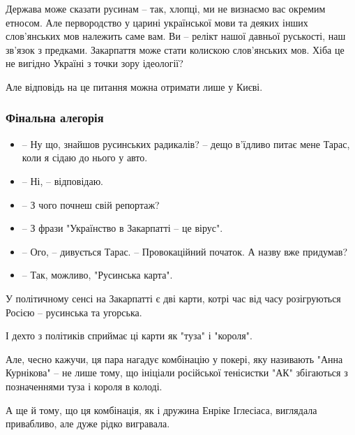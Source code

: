 Держава може сказати русинам – так, хлопці, ми не визнаємо вас окремим етносом.
Але первородство у царині української мови та деяких інших слов’янських мов
належить саме вам. Ви – релікт нашої давньої руськості, наш зв'язок з предками.
Закарпаття може стати колискою слов’янських мов. Хіба це не вигідно Україні з
точки зору ідеології?

Але відповідь на це питання можна отримати лише у Києві.

\subsubsection{Фінальна алегорія}

\begin{itemize}
  \item – Ну що, знайшов русинських радикалів? – дещо в’їдливо питає мене Тарас, коли я сідаю до нього у авто.
  \item – Ні, – відповідаю.
  \item – З чого почнеш свій репортаж?
  \item – З фрази "Українство в Закарпатті – це вірус".
  \item – Ого, – дивується Тарас. – Провокаційний початок. А назву вже придумав?
  \item – Так, можливо, "Русинська карта".
\end{itemize}

У політичному сенсі на Закарпатті є дві карти, котрі час від часу розігруються
Росією – русинська та угорська.

І дехто з політиків сприймає ці карти як "туза" і "короля".

Але, чесно кажучи, ця пара нагадує комбінацію у покері, яку називають "Анна
Курнікова" – не лише тому, що ініціали російської тенісистки "АК" збігаються з
позначеннями туза і короля в колоді.

А ще й тому, що ця комбінація, як і дружина Енріке Іглесіаса, виглядала
привабливо, але дуже рідко вигравала.
